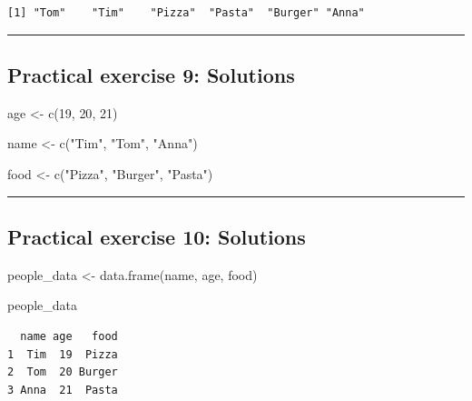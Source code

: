 \documentclass[
  letterpaper,
  DIV=11,
  numbers=noendperiod]{scrartcl}
\newenvironment{Shaded}{\begin{snugshade}}{\end{snugshade}}
\newcommand{\DecValTok}[1]{\textcolor[rgb]{0.68,0.00,0.00}{#1}}
\newcommand{\FunctionTok}[1]{\textcolor[rgb]{0.28,0.35,0.67}{#1}}
\newcommand{\NormalTok}[1]{\textcolor[rgb]{0.00,0.23,0.31}{#1}}
\newcommand{\OtherTok}[1]{\textcolor[rgb]{0.00,0.23,0.31}{#1}}
\newcommand{\StringTok}[1]{\textcolor[rgb]{0.13,0.47,0.30}{#1}}
\begin{document}
\begin{verbatim}
[1] "Tom"    "Tim"    "Pizza"  "Pasta"  "Burger" "Anna"  
\end{verbatim}

\begin{center}\rule{0.5\linewidth}{0.5pt}\end{center}

\subsection{Practical exercise 9:
Solutions}\label{practical-exercise-9-solutions}

\begin{Shaded}
\begin{Highlighting}[]
\NormalTok{age }\OtherTok{\textless{}{-}} \FunctionTok{c}\NormalTok{(}\DecValTok{19}\NormalTok{, }\DecValTok{20}\NormalTok{, }\DecValTok{21}\NormalTok{)}

\NormalTok{name }\OtherTok{\textless{}{-}} \FunctionTok{c}\NormalTok{(}\StringTok{"Tim"}\NormalTok{, }\StringTok{"Tom"}\NormalTok{, }\StringTok{"Anna"}\NormalTok{)}

\NormalTok{food }\OtherTok{\textless{}{-}} \FunctionTok{c}\NormalTok{(}\StringTok{"Pizza"}\NormalTok{, }\StringTok{"Burger"}\NormalTok{, }\StringTok{"Pasta"}\NormalTok{)}
\end{Highlighting}
\end{Shaded}

\begin{center}\rule{0.5\linewidth}{0.5pt}\end{center}

\subsection{Practical exercise 10:
Solutions}\label{practical-exercise-10-solutions}

\begin{Shaded}
\begin{Highlighting}[]
\NormalTok{people\_data }\OtherTok{\textless{}{-}} \FunctionTok{data.frame}\NormalTok{(name, age, food)}

\NormalTok{people\_data}
\end{Highlighting}
\end{Shaded}

\begin{verbatim}
  name age   food
1  Tim  19  Pizza
2  Tom  20 Burger
3 Anna  21  Pasta
\end{verbatim}
\end{document}
